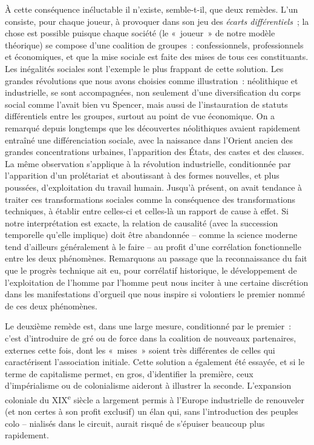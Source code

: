 \documentclass[french,twoside]{book} %
\begin{document}
À cette conséquence inéluctable il n’existe, semble-t-il, que deux remèdes. L’un consiste, pour chaque joueur, à provoquer dans son jeu des \emph{écarts différentiels} ; la chose est possible puisque chaque société (le « joueur » de notre modèle théorique) se compose d’une coalition de groupes : confessionnels, professionnels et économiques, et que la mise sociale est faite des mises de tous ces constituants. Les inégalités sociales sont l’exemple le plus frappant de cette solution. Les grandes révolutions que nous avons choisies comme illustration : néolithique et industrielle, se sont accompagnées, non seulement d’une diversification du corps social comme l’avait bien vu Spencer, mais aussi de l’instauration de statuts différentiels entre les groupes, surtout au point de vue économique. On a remarqué depuis longtemps que les découvertes néolithiques avaient rapidement entraîné une différenciation sociale, avec la naissance dans l’Orient ancien des grandes concentrations urbaines, l’apparition des États, des castes et des classes. La même observation s’applique à la révolution industrielle, conditionnée par l’apparition d’un prolétariat et aboutissant à des formes nouvelles, et plus poussées, d’exploitation du travail humain. Jusqu’à présent, on avait tendance à traiter ces transformations sociales comme la conséquence des transformations techniques, à établir entre celles-ci et celles-là un rapport de cause à effet. Si notre interprétation est exacte, la relation de causalité (avec la succession temporelle qu’elle implique) doit être abandonnée – comme la science moderne tend d’ailleurs généralement à le faire – au profit d’une corrélation fonctionnelle entre les deux phénomènes. Remarquons au passage que la reconnaissance du fait que le progrès technique ait eu, pour corrélatif historique, le développement de l’exploitation de l’homme par l’homme peut nous inciter à une certaine discrétion dans les manifestations d’orgueil que nous inspire si volontiers le premier nommé de ces deux phénomènes.\par
Le deuxième remède est, dans une large mesure, conditionné par le premier : c’est d’introduire de gré ou de force dans la coalition de nouveaux partenaires, externes cette fois, dont les « mises » soient très différentes de celles qui caractérisent l’association initiale. Cette solution a également été essayée, et si le terme de capitalisme permet, en gros, d’identifier la première, ceux d’impérialisme ou de colonialisme aideront à illustrer la seconde. L’expansion coloniale du XIX\textsuperscript{e} siècle a largement permis à l’Europe industrielle de renouveler (et non certes à son profit exclusif) un élan qui, sans l’introduction des peuples colo – nialisés dans le circuit, aurait risqué de s’épuiser beaucoup plus rapidement.\par
\end{document}
